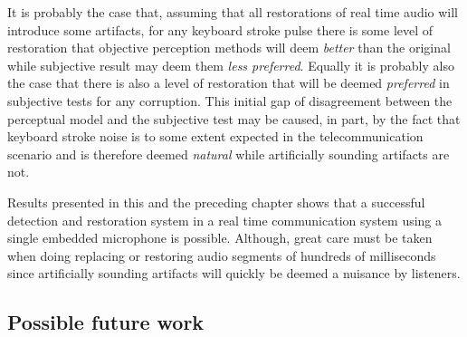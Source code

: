 It is probably the case that, assuming that all restorations of real time audio will introduce some artifacts, for any keyboard stroke pulse there is some level of restoration that objective perception methods will deem \emph{better} than the original while subjective result may deem them \emph{less preferred}. Equally it is probably also the case that there is also a level of restoration that will be deemed \emph{preferred} in subjective tests for any corruption. This initial gap of disagreement between the perceptual model and the subjective test may be caused, in part, by the fact that keyboard stroke noise is to some extent expected in the telecommunication scenario and is therefore deemed \emph{natural} while artificially sounding artifacts are not.

Results presented in this and the preceding chapter shows that a successful detection and restoration system in a real time communication system using a single embedded microphone is possible. Although, great care must be taken when doing replacing or restoring audio segments of hundreds of milliseconds since artificially sounding artifacts will quickly be deemed a nuisance by listeners.

\subsection{Possible future work}



